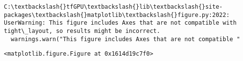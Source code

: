 \documentclass[11pt]{article}
\begin{document}
    \begin{Verbatim}[commandchars=\\\{\}]
C:\textbackslash{}tfGPU\textbackslash{}lib\textbackslash{}site-packages\textbackslash{}matplotlib\textbackslash{}figure.py:2022: UserWarning: This figure includes Axes that are not compatible with tight\_layout, so results might be incorrect.
  warnings.warn("This figure includes Axes that are not compatible "

    \end{Verbatim}

    
    \begin{verbatim}
<matplotlib.figure.Figure at 0x1614d19c7f0>
    \end{verbatim}

    
    \begin{center}
    \end{center}
    { \hspace*{\fill} \\}
    

    
    
    
    
\end{document}
